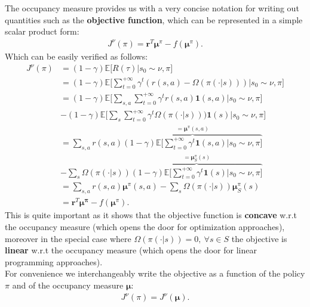 \begin{observation}
    \label{obs:mu_pi_objective}
    The occupancy measure provides us with a very concise notation for writing out quantities such as the \textbf{objective function}, which can be represented in a simple scalar product form:
    \begin{align*}
        J^\nu(\pi) = \bm{r}^T \bm{\mu}^\pi - f(\bm{\mu}^\pi).
    \end{align*}
    Which can be easily verified as follows:
    \begin{align*}
        J^\nu(\pi) &= (1-\gamma)  \mathbb{E}\Big[ R(\tau) \Big| s_0 \sim \nu, \pi \Big] \\
                &=  (1-\gamma) \mathbb{E}\Bigg[ \sum_{t=0}^{+\infty} \gamma^t (r(s,a) - \Omega(\pi(\cdot|s))) \Big| s_0 \sim \nu, \pi \Bigg]\\
                &= (1-\gamma)  \mathbb{E}\Bigg[ \sum_{s,a} \sum_{t=0}^{+\infty} \gamma^t  r(s,a) \textbf{1}(s,a) \Big| s_0 \sim \nu, \pi \Bigg] \\& -  (1-\gamma)  \mathbb{E}\Bigg[ \sum_{s} \sum_{t=0}^{+\infty} \gamma^t \Omega(\pi(\cdot|s))) \textbf{1}(s) \Big| s_0 \sim \nu, \pi \Bigg]   \\
                &= \sum_{s,a} r(s,a)\overbrace{ (1-\gamma) \mathbb{E}\Bigg[  \sum_{t=0}^{+\infty}\gamma^t  \textbf{1}(s,a) \Big| s_0 \sim \nu, \pi \Bigg]}^{=\bm{\mu}^\pi(s,a)}\\
                &- \sum_{s} \Omega(\pi(\cdot|s)) \overbrace{ (1-\gamma) \mathbb{E}\Bigg[  \sum_{t=0}^{+\infty} \gamma^t \textbf{1}(s) \Big| s_0 \sim \nu, \pi \Bigg]}^{=\bm{\mu}_S^\pi(s)}\\
                &= \sum_{s,a} r(s,a) \bm{\mu}^\pi(s,a) - \sum_{s} \Omega(\pi(\cdot|s)) \bm{\mu}_S^\pi(s) \\
                &=  \bm{r}^T \bm{\bm{\mu}^\pi} - f(\bm{\bm{\mu}}^\pi).
    \end{align*}
    This is quite important as it shows that the objective function is \textbf{concave} w.r.t the occupancy measure (which opens the door for optimization approaches), moreover in the special case where $\Omega(\pi(\cdot|s)) = 0, ~\forall s \in S $ the objective is \textbf{linear} w.r.t the occupancy measure (which opens the door for linear programming approaches). \\
    For convenience we interchangeably write the objective as a function of the policy $\pi$ and of the occupancy measure $\bm{\mu}$:
    \begin{align*}
        J^\nu(\pi) =  J^\nu(\bm{\mu}).
    \end{align*}
\end{observation}

